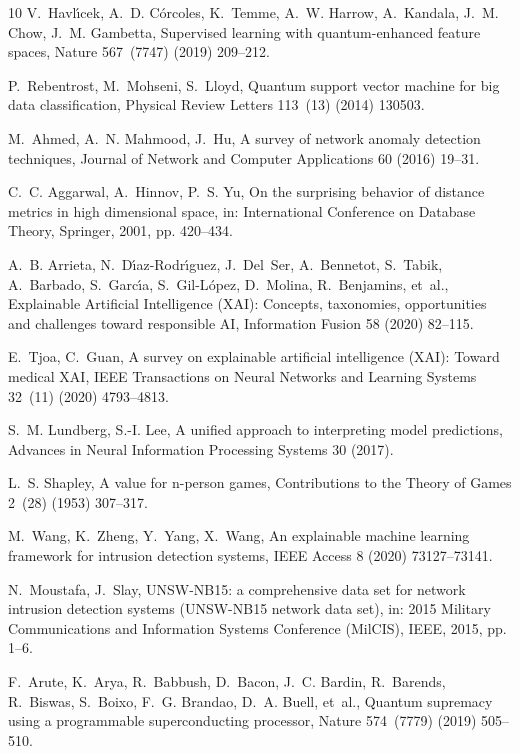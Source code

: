 \documentclass[preprint,12pt]{elsarticle}
\begin{document}
\begin{thebibliography}{10}
V.~Havl{\'\i}cek, A.~D. C{\'o}rcoles, K.~Temme, A.~W. Harrow, A.~Kandala, J.~M. Chow, J.~M. Gambetta,
\newblock Supervised learning with quantum-enhanced feature spaces,
\newblock Nature 567~(7747) (2019) 209--212.

P.~Rebentrost, M.~Mohseni, S.~Lloyd,
\newblock Quantum support vector machine for big data classification,
\newblock Physical Review Letters 113~(13) (2014) 130503.

M.~Ahmed, A.~N. Mahmood, J.~Hu,
\newblock A survey of network anomaly detection techniques,
\newblock Journal of Network and Computer Applications 60 (2016) 19--31.

C.~C. Aggarwal, A.~Hinnov, P.~S. Yu,
\newblock On the surprising behavior of distance metrics in high dimensional space,
\newblock in: International Conference on Database Theory, Springer, 2001, pp. 420--434.

A.~B. Arrieta, N.~D{\'\i}az-Rodr{\'\i}guez, J.~Del~Ser, A.~Bennetot, S.~Tabik, A.~Barbado, S.~Garc{\'\i}a, S.~Gil-L{\'o}pez, D.~Molina, R.~Benjamins, et~al.,
\newblock Explainable Artificial Intelligence (XAI): Concepts, taxonomies, opportunities and challenges toward responsible AI,
\newblock Information Fusion 58 (2020) 82--115.

E.~Tjoa, C.~Guan,
\newblock A survey on explainable artificial intelligence (XAI): Toward medical XAI,
\newblock IEEE Transactions on Neural Networks and Learning Systems 32~(11) (2020) 4793--4813.

S.~M. Lundberg, S.-I. Lee,
\newblock A unified approach to interpreting model predictions,
\newblock Advances in Neural Information Processing Systems 30 (2017).

L.~S. Shapley,
\newblock A value for n-person games,
\newblock Contributions to the Theory of Games 2~(28) (1953) 307--317.

M.~Wang, K.~Zheng, Y.~Yang, X.~Wang,
\newblock An explainable machine learning framework for intrusion detection systems,
\newblock IEEE Access 8 (2020) 73127--73141.

N.~Moustafa, J.~Slay,
\newblock UNSW-NB15: a comprehensive data set for network intrusion detection systems (UNSW-NB15 network data set),
\newblock in: 2015 Military Communications and Information Systems Conference (MilCIS), IEEE, 2015, pp. 1--6.

F.~Arute, K.~Arya, R.~Babbush, D.~Bacon, J.~C. Bardin, R.~Barends, R.~Biswas, S.~Boixo, F.~G. Brandao, D.~A. Buell, et~al.,
\newblock Quantum supremacy using a programmable superconducting processor,
\newblock Nature 574~(7779) (2019) 505--510.

\end{thebibliography}
\end{document}
